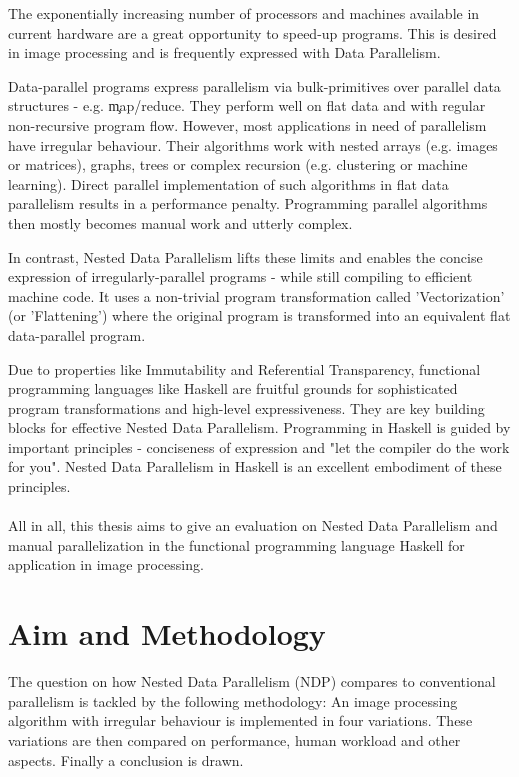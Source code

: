 

The exponentially increasing number of processors and machines
available in current hardware are a great
opportunity to speed-up programs.
This is desired in image processing
and is frequently expressed with Data Parallelism.

Data-parallel programs express parallelism
via bulk-primitives over parallel data structures - e.g. \c{map/reduce}.
They perform well on flat data and with regular
non-recursive program flow.
However, most applications in need of parallelism
have irregular behaviour. Their
algorithms work with nested
arrays (e.g. images or matrices),
graphs, trees or complex recursion (e.g. clustering or machine learning).
Direct parallel implementation of such algorithms
in flat data parallelism results in
a performance penalty.
Programming parallel algorithms then mostly
becomes manual work and utterly complex.

In contrast, Nested Data Parallelism \cite{Blelloch1996} lifts these limits
and enables the concise expression of irregularly-parallel programs
- while still compiling to efficient machine code.
It uses a non-trivial program transformation called 'Vectorization'
(or 'Flattening') where the original program is transformed
into an equivalent flat data-parallel program.

Due to properties like Immutability and Referential Transparency,
functional programming languages like Haskell are fruitful grounds for
sophisticated program transformations
and high-level expressiveness. They are key building
blocks for effective Nested Data Parallelism.
Programming in Haskell is guided by important principles - 
conciseness of expression
and "let the compiler do the work for you".
Nested Data Parallelism in Haskell
is an excellent embodiment of these principles.

\paragraph{}
All in all, this thesis aims to give an evaluation on
Nested Data Parallelism and manual parallelization in the functional
programming language Haskell for application
in image processing.


\section{Aim and Methodology}
  The question on how Nested Data Parallelism (NDP) compares to
  conventional parallelism is tackled by the following methodology:
  An image processing algorithm with irregular behaviour
  is implemented in four variations. These variations are
  then compared on performance, human workload and other aspects.
  Finally a conclusion is drawn.
  
